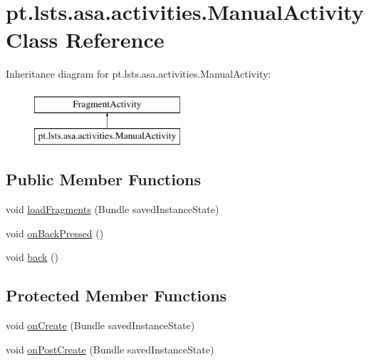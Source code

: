 \hypertarget{classpt_1_1lsts_1_1asa_1_1activities_1_1ManualActivity}{}\section{pt.\+lsts.\+asa.\+activities.\+Manual\+Activity Class Reference}
\label{classpt_1_1lsts_1_1asa_1_1activities_1_1ManualActivity}
Inheritance diagram for pt.\+lsts.\+asa.\+activities.\+Manual\+Activity\+:\begin{figure}[H]
\begin{center}
\leavevmode
\includegraphics[height=2.000000cm]{classpt_1_1lsts_1_1asa_1_1activities_1_1ManualActivity}
\end{center}
\end{figure}
\subsection*{Public Member Functions}
\begin{DoxyCompactItemize}
\item 
void \hyperlink{classpt_1_1lsts_1_1asa_1_1activities_1_1ManualActivity_a9830353f491e2b0827dfc6fed433ba36}{load\+Fragments} (Bundle saved\+Instance\+State)
\item 
void \hyperlink{classpt_1_1lsts_1_1asa_1_1activities_1_1ManualActivity_ae01dab5b45836aaa2cc66666c5c25f4b}{on\+Back\+Pressed} ()
\item 
void \hyperlink{classpt_1_1lsts_1_1asa_1_1activities_1_1ManualActivity_adfddcc7c8bb74a1c3af26e2301aee4cd}{back} ()
\end{DoxyCompactItemize}
\subsection*{Protected Member Functions}
\begin{DoxyCompactItemize}
\item 
void \hyperlink{classpt_1_1lsts_1_1asa_1_1activities_1_1ManualActivity_ab80e4ec2e04ff12b49eeff9f48702dcf}{on\+Create} (Bundle saved\+Instance\+State)
\item 
void \hyperlink{classpt_1_1lsts_1_1asa_1_1activities_1_1ManualActivity_ae663bf1244d944dbf1cbc3d6a7d86d86}{on\+Post\+Create} (Bundle saved\+Instance\+State)
\end{DoxyCompactItemize}
